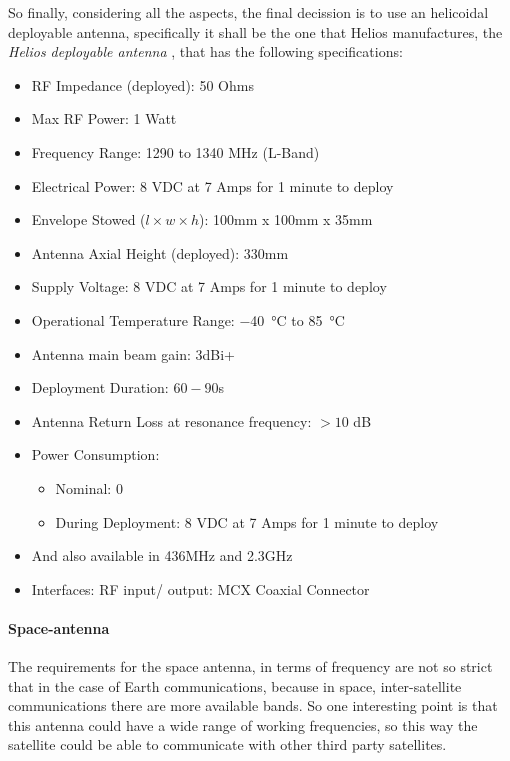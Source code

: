 So finally, considering all the aspects, the final decission is to use an helicoidal
deployable antenna, specifically it shall be the one that Helios
manufactures, the \textit{Helios deployable antenna} \cite{HeliosAntenna},
that has the following specifications:

\begin{itemize}
	\item RF Impedance (deployed): 50 Ohms
	\item Max RF Power: 1 Watt
	\item Frequency Range: 1290 to 1340 MHz (L-Band)
	\item Electrical Power: 8 VDC at 7 Amps for 1 minute to deploy
	\item Envelope Stowed ($l \times w \times h$): 100mm x 100mm x 35mm
	\item Antenna Axial Height (deployed): 330mm
	\item Supply Voltage: 8 VDC at 7 Amps for 1 minute to deploy
	\item Operational Temperature Range: \SI{-40}{\degreeCelsius} to \SI{85}{\degreeCelsius}
	\item Antenna main beam gain: 3dBi+
	\item Deployment Duration: $60-90$s
	\item Antenna Return Loss at resonance frequency: $ >10$ dB
	\item Power Consumption:
	\begin{itemize}
		\item Nominal: 0
		\item During Deployment: 8 VDC at 7 Amps for 1 minute to deploy
	\end{itemize}
	\item And also available in 436MHz and 2.3GHz
	\item Interfaces: RF input/ output: MCX Coaxial Connector
\end{itemize}

\paragraph{Space-antenna}

The requirements for the space antenna, in terms of frequency are not so strict
that in the case of Earth communications, because in space, inter-satellite
communications there are more available bands. So one interesting point is that
this antenna could have a wide range of working frequencies, so this way the
satellite could be able to communicate with other third party satellites.

